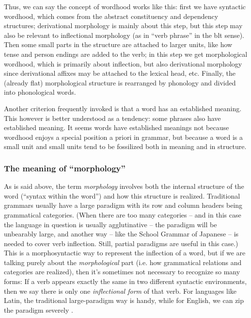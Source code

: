 \documentclass[UTF8, a4paper, oneside, scheme=plain, 12pt]{ctexbook}
\newcommand*{\citesec}[1]{\S~{#1}}
\newcommand*{\citechap}[1]{Ch.~{#1}}
\newcommand*{\citechapsec}[2]{\citechap{#1}.\citesec{#2}}
\newcommand*{\term}[1]{\emph{#1}}
\begin{document}
{Thus, we can say the concept of wordhood works like this: 
first we have syntactic wordhood, 
which comes from the abstract constituency and dependency structures; 
derivational morphology is mainly about this step, 
but this step may also be relevant to inflectional morphology
(as in ``verb phrase'' in the \acs{blt} sense). 
Then some small parts in the structure 
are attached to larger units, like how tense and person endings are added to the verb; 
in this step we get morphological wordhood, 
which is primarily about inflection, 
but also derivational morphology 
since derivational affixes may be attached to the lexical head, etc.
Finally, the (already flat) morphological structure is rearranged 
by phonology and divided into phonological words.

Another criterion frequently invoked is that 
a word has an established meaning.
This however is better understood as a tendency:
some phrases also have established meaning.
It seems words have established meanings not because 
wordhood enjoys a special position a priori in grammar, 
but because a word is a small unit 
and small units tend to be fossilized both in meaning and in structure.

\subsubsection{The meaning of ``morphology''}

As is said above, the term \term{morphology}
involves both the internal structure of the word 
(``syntax within the word'')
and how this structure is realized.
Traditional grammars usually have a large paradigm
with its row and column headers being grammatical categories.
(When there are too many categories 
-- and in this case the language in question is usually agglutinative -- 
the paradigm will be unbearably large, 
and another way -- like the School Grammar of Japanese -- is needed to cover verb inflection.
Still, partial paradigms are useful in this case.) 
This is a morphosyntactic way to represent the inflection of a word, 
but if we are talking purely about the \emph{morphological} part
(i.e. how grammatical relations and categories are realized),
then it's sometimes not necessary to recognize so many forms:
If a verb appears exactly the same in two different syntactic environments,
then we say there is only one \emph{inflectional form} of that verb.
For languages like Latin, 
the traditional large-paradigm way is handy,
while for English, we can zip the paradigm severely \citep[\citechapsec{3}{1.2}]{cgel}.

}
\end{document}
